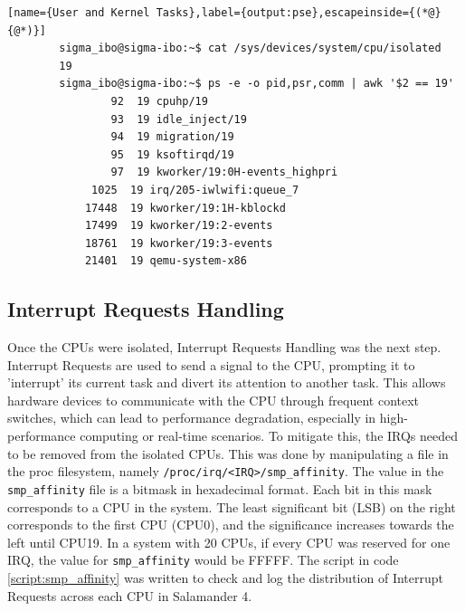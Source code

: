 \documentclass[MMR,Master,english]{twbook}
\begin{document}
\vspace{1em}
\begin{minipage}{0.95\columnwidth}
	\begin{lstlisting}[name={User and Kernel Tasks},label={output:pse},escapeinside={(*@}{@*)}]
		sigma_ibo@sigma-ibo:~$ cat /sys/devices/system/cpu/isolated
		19
		sigma_ibo@sigma-ibo:~$ ps -e -o pid,psr,comm | awk '$2 == 19'
				92  19 cpuhp/19
				93  19 idle_inject/19
 	    		94  19 migration/19
 	    		95  19 ksoftirqd/19
 	    		97  19 kworker/19:0H-events_highpri
 	 		 1025  19 irq/205-iwlwifi:queue_7
 	 		17448  19 kworker/19:1H-kblockd
 	 		17499  19 kworker/19:2-events
 	 		18761  19 kworker/19:3-events
			21401  19 qemu-system-x86
\end{lstlisting}
\end{minipage}

\clearpage

\subsection{Interrupt Requests Handling}\label{sec:irq_handling}
Once the CPUs were isolated, Interrupt Requests Handling was the next step. Interrupt Requests are used to send a signal to the CPU, prompting it to 'interrupt' its current task and divert its attention to another task. This allows hardware devices to communicate with the CPU through frequent context switches, which can lead to performance degradation, especially in high-performance computing or real-time scenarios. To mitigate this, the IRQs needed to be removed from the isolated CPUs. This was done by manipulating a file in the proc filesystem, namely \texttt{/proc/irq/<IRQ>/smp\_affinity}. The value in the \texttt{smp\_affinity} file is a bitmask in hexadecimal format. Each bit in this mask corresponds to a CPU in the system. The least significant bit (LSB) on the right corresponds to the first CPU (CPU0), and the significance increases towards the left until CPU19. In a system with 20 CPUs, if every CPU was reserved for one IRQ, the value for \texttt{smp\_affinity} would be FFFFF. The script in code \ref{script:smp_affinity} was written to check and log the distribution of Interrupt Requests across each CPU in Salamander 4.
\end{document}
